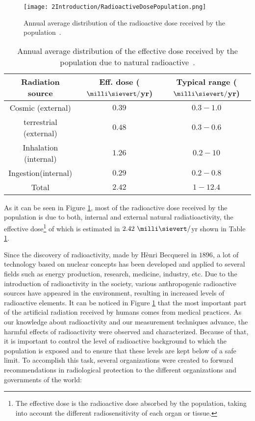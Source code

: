 \begin{figure}[h]
\texttt{[image: 2Introduction/RadioactiveDosePopulation.png]}
\centering
\caption{Annual average distribution of the radioactive dose received by the population~\cite{IAEA}\label{fig:RadioactiveDosePopulation}.}
\end{figure}


\begin{table}[h]
\begin{center}
\begin{tabular}{|c|c|c|}
\hline
Radiation source & Eff. dose ($\milli\sievert/$yr) & Typical range ($\milli\sievert/$yr)\\
\hline \hline \hline
Cosmic (external) & $0.39$ & $0.3 - 1.0$ \\ \hline
terrestrial (external) & $0.48$ & $0.3-0.6$ \\ \hline
\hline  
Inhalation (internal) & $1.26$ & $0.2-10$ \\ \hline
Ingestion(internal) & $0.29$ & $0.2-0.8$ \\ \hline
\hline 
Total & $2.42$ & $1-12.4$ \\ \hline
\end{tabular}
\caption{Annual average distribution of the effective dose received by the population due to natural radioactive~\cite{UNSCEAR, CSN}.}
\label{tab:RadioactiveNaturalDosePopulation}
\end{center}
\end{table}

As it can be seen in Figure \ref{fig:RadioactiveDosePopulation}, most of the radioactive dose received by the population is due to both, internal and external natural radiatioactivity, the effective dose\footnote{The effective dose is the radioactive dose absorbed by the population, taking into account the different radiosensitivity of each organ or tissue.} of which is estimated in $2.42~\milli\sievert/$yr shown in Table \ref{tab:RadioactiveNaturalDosePopulation}. 

Since the discovery of radioactivity, made by Hènri Becquerel in $1896$, a lot of technology based on nuclear concepts has been developed and applied to several fields such as energy production, research, medicine, industry, etc. Due to the introduction of radioactivity in the society, various anthropogenic radioactive sources have appeared in the environment, resulting in increased levels of radioactive elements.  It can be noticed in Figure \ref{fig:RadioactiveDosePopulation} that the most important part of the artificial radiation received by humans comes from medical practices. As our knowledge about radioactivity and our measurement techniques advance, the harmful effects of radioactivity were observed and characterized. Because of that, it is important to control the level of radioactive background to which the population is exposed and to ensure that these levels are kept below of a safe limit. To accomplish this task, several organizations were created to forward recommendations in radiological protection to the different organizations and governments of the world:

